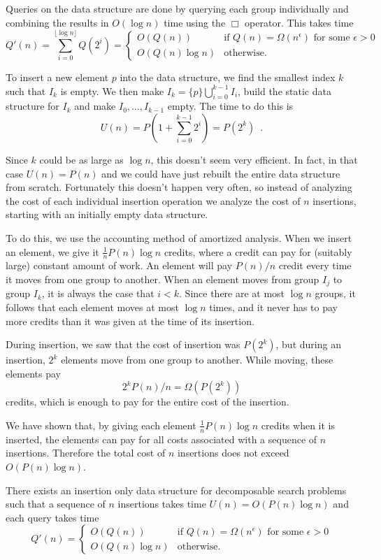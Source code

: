 Queries on the data structure are done by querying each group
individually and combining the results in $O(\log n)$ time using the
$\Box$ operator.  This takes time
\[
	Q'(n) = \sum_{i=0}^{\lfloor\log n\rfloor} Q(2^i) 
	= \left\{\begin{array}{ll}
		O(Q(n)) & \mbox{if $Q(n)=\Omega(n^\epsilon)$ 
			for some $\epsilon>0$} \\
		O(Q(n)\log n) & \mbox{otherwise.} 
	\end{array}\right.
\]

To insert a new element $p$ into the data structure, we find the
smallest index $k$ such that $I_k$ is empty.  We then make
$I_k=\{p\}\bigcup_{i=0}^{k-1}I_i$, build the static data structure
for $I_k$ and make $I_0,\ldots,I_{k-1}$ empty.  The time to do
this is 
\[
   U(n) = P\left(1+ \sum_{i=0}^{k-1}2^i\right) = P(2^k) \enspace .
\]

Since $k$ could be as large as $\log n$, this doesn't seem very
efficient.  In fact, in that case $U(n)=P(n)$ and we could have just
rebuilt the entire data structure from scratch.  Fortunately this
doesn't happen very often, so instead of analyzing the cost of each
individual insertion operation we analyze the cost of $n$ insertions,
starting with an initially empty data structure.

To do this, we use the accounting method of amortized analysis.  When
we insert an element, we give it $\frac{1}{n}P(n)\log n$ credits,
where a credit can pay for (suitably large) constant amount of work.
An element will pay $P(n)/n$ credit every time it moves from one group
to another.  When an element moves from group $I_j$ to group $I_k$, it
is always the case that $i<k$.  Since there are at most $\log n$
groups, it follows that each element moves at most $\log n$ times, and
it never has to pay more credits than it was given at the time of its
insertion.

During insertion, we saw that the cost of insertion was $P(2^k)$, but
during an insertion, $2^k$ elements move from one group to another.
While moving, these elements pay 
\[
2^kP(n)/n = \Omega(P(2^k))
\]
credits, which is enough to pay for the entire cost of the insertion.

We have shown that, by giving each element $\frac{1}{n}P(n)\log n$
credits when it is inserted, the elements can pay for all costs
associated with a sequence of $n$ insertions.  Therefore the total
cost of $n$ insertions does not exceed $O(P(n)\log n)$.

\begin{thm}
There exists an insertion only data structure for decomposable search
problems such that a sequence of $n$ insertions takes time
$U(n)=O(P(n)\log n)$ and each query takes time
\[
	Q'(n) 
	= \left\{\begin{array}{ll}
		O(Q(n)) & \mbox{if $Q(n)=\Omega(n^\epsilon)$ 
			for some $\epsilon>0$} \\
		O(Q(n)\log n) & \mbox{otherwise.} 
	\end{array}\right.
\]
\end{thm}


